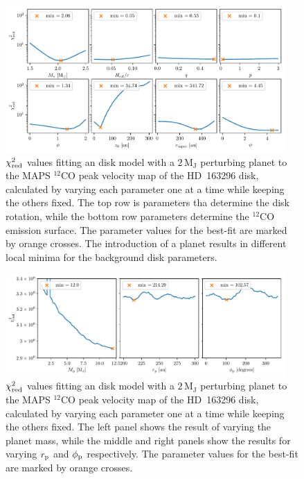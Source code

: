 \begin{figure}
    \centering
    \includegraphics[width = 0.95\textwidth]{figures/chi_sq_background_planet_hd163.pdf}
    \caption{$\chi_{\rm red}^2$ values fitting an disk model with a $2 \, \mathrm{M_J}$ perturbing planet to the MAPS $^{12}$CO peak velocity map of the HD~163296 disk, calculated by varying each parameter one at a time while keeping the others fixed. The top row is parameters tha determine the disk rotation, while the bottom row parameters determine the $^{12}$CO emission surface. The parameter values for the best-fit are marked by orange crosses. The introduction of a planet results in different local minima for the background disk parameters.}
    \label{fig:grid_chisq_planet_bg}
\end{figure}

\begin{figure}
    \centering
    \includegraphics[width = 0.95\textwidth]{figures/chi_sq_planet_hd163.pdf}
    \caption{$\chi_{\rm red}^2$ values fitting an disk model with a $2 \, \mathrm{M_J}$ perturbing planet to the MAPS $^{12}$CO peak velocity map of the HD~163296 disk, calculated by varying each parameter one at a time while keeping the others fixed. The left panel shows the result of varying the planet mass, while the middle and right panels show the results for varying $r_{\rm p}$ and $\phi_{\rm p}$ respectively. The parameter values for the best-fit are marked by orange crosses.}
    \label{fig:grid_chisq_planet}
\end{figure}

